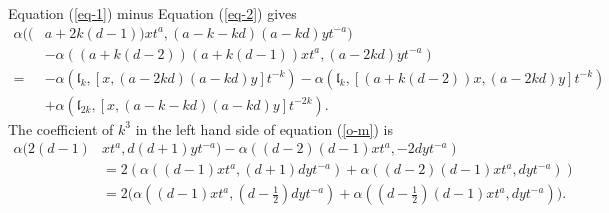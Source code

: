 \documentclass[1p]{elsarticle}
\numberwithin{equation}{section}
\def\fL{\mathfrak{L}}
\def\bC{\mathbb{C}}
\def\fl{\mathfrak{l}}
\begin{document}
Equation (\ref{eq-1}) minus Equation (\ref{eq-2}) gives
\begin{equation}\label{o-m}\begin{aligned}\alpha((&a+2k(d-1))xt^a,(a-k-kd)(a-kd)yt^{-a})\\& -\alpha((a+k(d-2))(a+k(d-1))xt^a,(a-2kd)yt^{-a})\\
=&-\alpha(\fl_{k},[x,(a-2kd)(a-kd)y]t^{-k}) -\alpha(\fl_{k},[(a+k(d-2))x,(a-2kd)y]t^{-k})
\\&+\alpha(\fl_{2k},[x,(a-k-kd)(a-kd)y]t^{-2k}).\end{aligned}\end{equation}
The coefficient of $k^3$ in the left hand side of equation (\ref{o-m}) is
\begin{equation}\label{lhd}\begin{aligned} \alpha(2(d-1)&xt^a, d(d+1)yt^{-a})-\alpha((d-2)(d-1)xt^a,-2dyt^{-a})\\
&=2(\alpha((d-1)xt^a, (d+1)dyt^{-a})+\alpha((d-2)(d-1)xt^a,dyt^{-a}))\\
&=2\Big(\alpha((d-1)xt^a, (d-\frac 12)dyt^{-a})+\alpha((d-\frac 12)(d-1)xt^a,dyt^{-a})\Big).\end{aligned}\end{equation}








\end{document}
